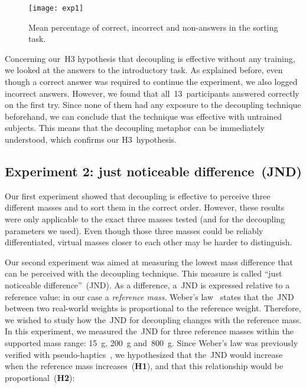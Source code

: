 \documentclass{vgtc}
\begin{document}
\begin{figure}[t]
  \centering
  \texttt{[image: exp1]}
  \vspace{-3mm}
  \caption{Mean percentage of correct, incorrect and non-answers in the sorting task. }
  \label{fig:exp1-results}
  \vspace{-4mm}
\end{figure}

Concerning our~H3 hypothesis that decoupling is effective \mbox{without} any training, we looked at the answers to the introductory task. As explained before, even though a correct answer was required to continue the experiment, we also logged incorrect answers. However, we found that all~13~participants answered correctly on the first try. Since none of them had any exposure to the decoupling technique beforehand, we can conclude that the technique was effective with untrained subjects. This means that the decoupling metaphor can be immediately understood, which confirms our H3~hypothesis.

\subsection{Experiment 2: just noticeable difference~(JND)}

Our first experiment showed that decoupling is effective to perceive three different masses and to sort them in the correct order. However, these results were only applicable to the exact three masses tested (and for the decoupling parameters we used). Even though those three masses could be reliably differentiated, virtual masses closer to each other may be harder to distinguish.

Our second experiment was aimed at measuring the lowest mass difference that can be perceived with the decoupling technique. This measure is called ``just noticeable difference''~(JND). As a difference, a~JND is expressed relative to a reference value: in our case a \emph{reference mass}. Weber's law~\cite{ross96} states that the~JND between two real-world weights is proportional to the reference weight. Therefore, we wished to study how the~JND for decoupling changes with the reference mass. In this experiment, we measured the~JND for three reference masses within the supported mass range: \SI{15}{\gram}, \SI{200}{\gram} and~\SI{800}{\gram}. Since Weber's law was previously verified with pseudo-haptics~\cite{dominjon05}, we hypothesized that the~JND would increase when the reference mass increases~(\textbf{H1}), and that this relationship would be proportional~(\textbf{H2}):
\end{document}
